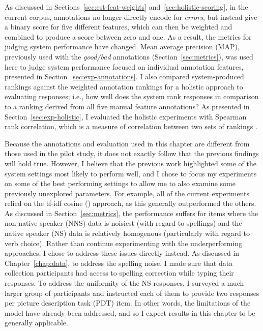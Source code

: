 As discussed in Sections~\ref{sec:est-feat-weights} and~\ref{sec:holistic-scoring}, in the current corpus, annotations no longer directly encode for \textit{errors}, but instead give a binary score for five different features, which can then be weighted and combined to produce a score between zero and one. As a result, the metrics for judging system performance have changed. Mean average precision (MAP), previously used with the \textit{good/bad} annotations (Section~\ref{sec:metrics}), was used here to judge system performance focused on individual annotation features, presented in Section~\ref{sec:exp-annotations}. I also compared system-produced rankings against the weighted annotation rankings for a holistic approach to evaluating responses; i.e., how well does the system rank responses in comparison to a ranking derived from all five manual feature annotations? As presented in Section~\ref{sec:exp-holistic}, I evaluated the holistic experiments with Spearman rank correlation, which is a measure of correlation between two sets of rankings \cite{dodge2008concise}.

Because the annotations and evaluation used in this chapter are different from those used in the pilot study, it does not exactly follow that the previous findings will hold true. However, I believe that the previous work highlighted some of the system settings most likely to perform well, and I chose to focus my experiments on some of the best performing settings to allow me to also examine some previously unexplored parameters. For example, all of the current experiments relied on the tf-idf cosine () approach, as this generally outperformed the others. As discussed in Section~\ref{sec:metrics}, the  performance suffers for items where the non-native speaker (NNS) data is noisiest (with regard to spellings) and the native speaker (NS) data is relatively homogenous (particularly with regard to verb choice). Rather than continue experimenting with the underperforming approaches, I chose to address these issues directly instead. As discussed in Chapter~\ref{chap:data}, to address the spelling noise, I made sure that data collection participants had access to spelling correction while typing their responses. To address the uniformity of the NS responses, I surveyed a much larger group of participants and instructed each of them to provide two responses per picture description task (PDT) item. In other words, the limitations of the  model have already been addressed, and so I expect results in this chapter to be generally applicable.

